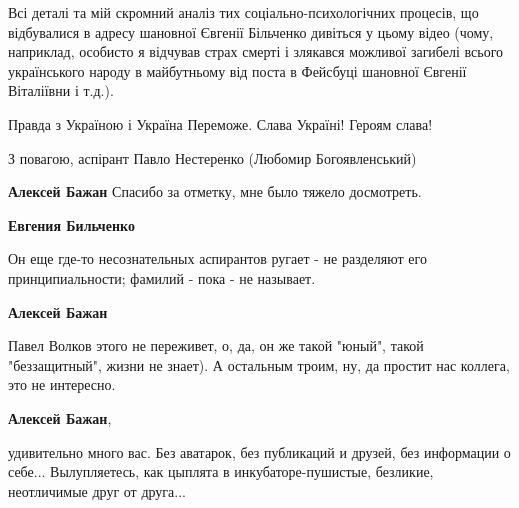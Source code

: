 \begin{itemize}
{Всі деталі та мій скромний аналіз тих соціально-психологічних процесів, що
відбувалися в адресу шановної Євгенії Більченко дивіться у цьому відео (чому,
наприклад, особисто я відчував страх смерті і злякався можливої загибелі всього
українського народу в майбутньому від поста в Фейсбуці шановної Євгенії
Віталіївни і т.д.). 

Правда з Україною і Україна Переможе. Слава Україні! Героям слава!

З повагою, аспірант Павло Нестеренко (Любомир Богоявленський)
}

\begin{itemize}
 
\textbf{Алексей Бажан} Спасибо за отметку, мне было тяжело досмотреть.

 
\textbf{Евгения Бильченко} 

Он еще где-то несознательных аспирантов ругает - не разделяют его
принципиальности; фамилий - пока - не называет.


 
\textbf{Алексей Бажан} 

Павел Волков этого не переживет, о, да, он же такой "юный", такой
"беззащитный", жизни не знает). А остальным троим, ну, да простит нас коллега,
это не интересно.


 
\textbf{Алексей Бажан},

удивительно много вас. Без аватарок, без публикаций и друзей, без информации о
себе... Вылупляетесь, как цыплята в инкубаторе-пушистые, безликие, неотличимые
друг от друга...


\end{itemize}
\end{itemize}

